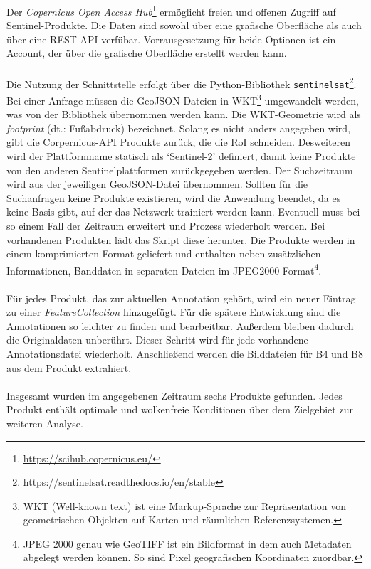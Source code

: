 Der \textit{Copernicus Open Access Hub}\footnote{\url{https://scihub.copernicus.eu/}} ermöglicht freien und offenen Zugriff auf Sentinel-Produkte. Die Daten sind sowohl über eine grafische Oberfläche als auch über eine REST-API verfübar. Vorrausgesetzung für beide Optionen ist ein Account, der über die grafische Oberfläche erstellt werden kann.
\\\\
Die Nutzung der Schnittstelle erfolgt über die Python-Bibliothek \texttt{sentinelsat}\footnote{https://sentinelsat.readthedocs.io/en/stable}. Bei einer Anfrage müssen die GeoJSON-Dateien in WKT\footnote{WKT (Well-known text) ist eine Markup-Sprache zur Repräsentation von geometrischen Objekten auf Karten und räumlichen Referenzsystemen.} umgewandelt werden, was von der Bibliothek übernommen werden kann. Die WKT-Geometrie wird als \textit{footprint} (dt.: Fußabdruck) bezeichnet. Solang es nicht anders angegeben wird, gibt die Corpernicus-API Produkte zurück, die die RoI schneiden. Desweiteren wird der Plattformname statisch als `Sentinel-2' definiert, damit keine Produkte von den anderen Sentinelplattformen zurückgegeben werden. Der Suchzeitraum wird aus der jeweiligen GeoJSON-Datei übernommen. Sollten für die Suchanfragen keine Produkte existieren, wird die Anwendung beendet, da es keine Basis gibt, auf der das Netzwerk trainiert werden kann. Eventuell muss bei so einem Fall der Zeitraum erweitert und Prozess wiederholt werden. Bei vorhandenen Produkten lädt das Skript diese herunter. Die Produkte werden in einem komprimierten Format geliefert und enthalten neben zusätzlichen Informationen, Banddaten in separaten Dateien im JPEG2000-Format\footnote{JPEG 2000 genau wie GeoTIFF ist ein Bildformat in dem auch Metadaten abgelegt werden können. So sind Pixel geografischen Koordinaten zuordbar.}.
\\\\
Für jedes Produkt, das zur aktuellen Annotation gehört, wird ein neuer Eintrag zu einer \textit{FeatureCollection} hinzugefügt. Für die spätere Entwicklung sind die Annotationen so leichter zu finden und bearbeitbar. Außerdem bleiben dadurch die Originaldaten unberührt. Dieser Schritt wird für jede vorhandene Annotationsdatei wiederholt. Anschließend werden die Bilddateien für B4 und B8 aus dem Produkt extrahiert.
\\\\
Insgesamt wurden im angegebenen Zeitraum sechs Produkte gefunden. Jedes Produkt enthält optimale und wolkenfreie Konditionen über dem Zielgebiet zur weiteren Analyse.

